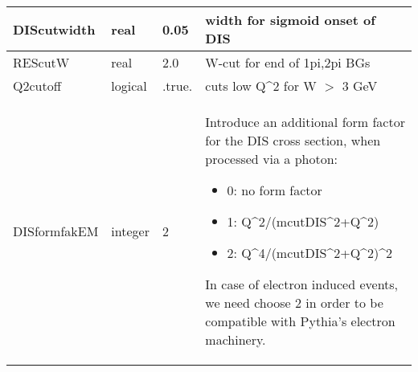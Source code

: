 \documentclass{article}
\begin{document}
\begin{longtable}{llll}
\midrule
DIScutwidth & \begin{minipage}[t]{2cm}real\end{minipage} & \begin{minipage}[t]{2cm}0.05\end{minipage} & \begin{minipage}[t]{12cm}width for sigmoid onset of DIS\end{minipage}\\*
\midrule
REScutW & \begin{minipage}[t]{2cm}real\end{minipage} & \begin{minipage}[t]{2cm}2.0\end{minipage} & \begin{minipage}[t]{12cm}W-cut for end of 1pi,2pi BGs\end{minipage}\\*
\midrule
Q2cutoff & \begin{minipage}[t]{2cm}logical\end{minipage} & \begin{minipage}[t]{2cm}.true.\end{minipage} & \begin{minipage}[t]{12cm}cuts low Q\^{}2 for W $>$ 3 GeV\end{minipage}\\*
\midrule
DISformfakEM & \begin{minipage}[t]{2cm}integer\end{minipage} & \begin{minipage}[t]{2cm}2\end{minipage} & \begin{minipage}[t]{12cm}Introduce an additional form factor for the DIS cross section, when processed via a photon:\begin{itemize}\leftmargin0em\itemindent0pt\item 0: no form factor\item 1: Q\^{}2/(mcutDIS\^{}2+Q\^{}2)\item 2: Q\^{}4/(mcutDIS\^{}2+Q\^{}2)\^{}2\end{itemize} In case of electron induced events, we need choose 2 in order to be compatible with Pythia's electron machinery.\end{minipage}\\*
\midrule

\end{longtable}
\end{document}

